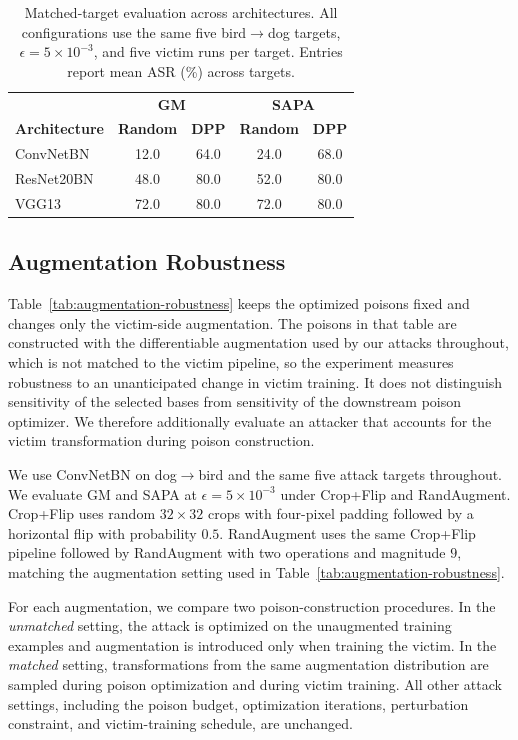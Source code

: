 \begin{table}[t]
\centering
\caption{
Matched-target evaluation across architectures. All configurations use
the same five bird$\rightarrow$dog targets,
$\epsilon=5\times10^{-3}$, and five victim runs per target.
Entries report mean ASR (\%) across targets.
}
\label{tab:matched-architecture}
\small
\setlength{\tabcolsep}{8pt}
\renewcommand{\arraystretch}{1.08}
\begin{tabular}{l|cc|cc}
\toprule
&
\multicolumn{2}{c|}{\textbf{GM}} &
\multicolumn{2}{c}{\textbf{SAPA}} \\
\textbf{Architecture} &
\textbf{Random} & \textbf{DPP} &
\textbf{Random} & \textbf{DPP} \\
\midrule
ConvNetBN  & 12.0 & 64.0 & 24.0 & 68.0 \\
ResNet20BN & 48.0 & 80.0 & 52.0 & 80.0 \\
VGG13      & 72.0 & 80.0 & 72.0 & 80.0 \\
\bottomrule
\end{tabular}
\end{table}


\subsection{Augmentation Robustness}
\label{sec:augmentation-aware}

Table~\ref{tab:augmentation-robustness} keeps the optimized poisons
fixed and changes only the victim-side augmentation. The poisons in that
table are constructed with the differentiable augmentation used by our
attacks throughout, which is not matched to the victim pipeline, so the
experiment measures robustness to an unanticipated change in victim
training. It does not distinguish sensitivity of the selected bases from
sensitivity of the downstream poison optimizer. We therefore additionally
evaluate an attacker that accounts for the victim transformation during
poison construction.

We use ConvNetBN on dog$\rightarrow$bird and the same five attack targets
throughout. We evaluate GM and SAPA at
$\epsilon=5\times10^{-3}$ under Crop+Flip and RandAugment. Crop+Flip
uses random $32\times32$ crops with four-pixel padding followed by a
horizontal flip with probability $0.5$. RandAugment uses the same
Crop+Flip pipeline followed by RandAugment with two operations and
magnitude $9$, matching the augmentation setting used in
Table~\ref{tab:augmentation-robustness}.

For each augmentation, we compare two poison-construction procedures.
In the \emph{unmatched} setting, the attack is optimized on the
unaugmented training examples and augmentation is introduced only when
training the victim. In the \emph{matched} setting, transformations from
the same augmentation distribution are sampled during poison
optimization and during victim training. All other attack settings,
including the poison budget, optimization iterations, perturbation
constraint, and victim-training schedule, are unchanged.

